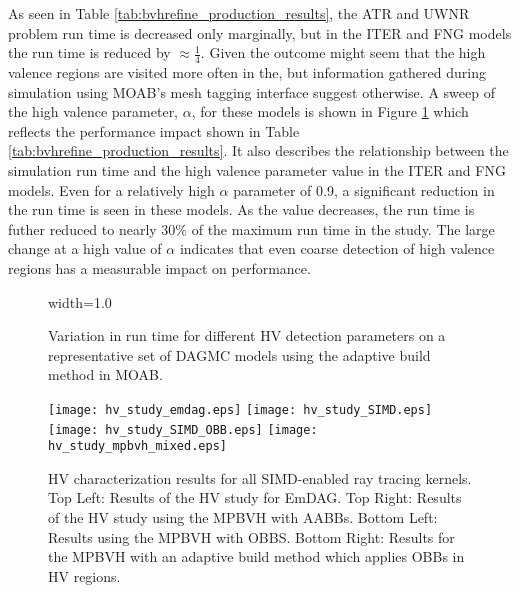As seen in Table \ref{tab:bvhrefine_production_results}, the ATR and UWNR
problem run time is decreased only marginally, but in the ITER and FNG models
the run time is reduced by $\approx\frac{1}{4}$. Given the outcome might seem
that the high valence regions are visited more often in the, but information
gathered during simulation using MOAB's mesh tagging interface suggest
otherwise. A sweep of the high valence parameter, $\alpha$, for these models is
shown in Figure \ref{fig:hv_parameter_study_moab} which reflects the performance
impact shown in Table \ref{tab:bvhrefine_production_results}. It also describes
the relationship between the simulation run time and the high valence parameter
value in the ITER and FNG models. Even for a relatively high $\alpha$ parameter
of 0.9, a significant reduction in the run time is seen in these models. As the
value decreases, the run time is futher reduced to nearly 30\% of the maximum
run time in the study. The large change at a high value of $\alpha$ indicates
that even coarse detection of high valence regions has a measurable impact on
performance.

\begin{figure}[H]
  \centering
  {width=1.0\textwidth}
  \caption[High valence detection parameter study.]{Variation in run time for
    different HV detection parameters on a representative set of DAGMC models
    using the adaptive build method in MOAB.}
  \label{fig:hv_parameter_study_moab}
\end{figure}


\begin{sidewaysfigure}
  \centering
  \texttt{[image: hv\_study\_emdag.eps]}
  \texttt{[image: hv\_study\_SIMD.eps]}
  \texttt{[image: hv\_study\_SIMD\_OBB.eps]}
  \texttt{[image: hv\_study\_mpbvh\_mixed.eps]}
  \caption[HV characterization studies using EmDAG and MPBVH.]{HV characterization results for all SIMD-enabled ray tracing
    kernels. Top Left: Results of the HV study for EmDAG. Top Right: Results of
    the HV study using the MPBVH with AABBs. Bottom Left: Results using the
    MPBVH with OBBS. Bottom Right: Results for the MPBVH with an adaptive build
    method which applies OBBs in HV regions.}
  \label{fig:simd_hv_studies}
\end{sidewaysfigure}

